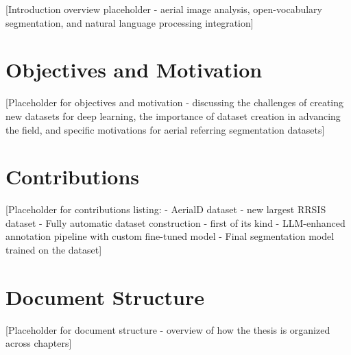 \cleardoublepage
\label{chap:intro}
[Introduction overview placeholder - aerial image analysis, open-vocabulary segmentation, and natural language processing integration]

\section{Objectives and Motivation}

[Placeholder for objectives and motivation - discussing the challenges of creating new datasets for deep learning, the importance of dataset creation in advancing the field, and specific motivations for aerial referring segmentation datasets]

\section{Contributions}

[Placeholder for contributions listing:
- AerialD dataset - new largest RRSIS dataset
- Fully automatic dataset construction - first of its kind
- LLM-enhanced annotation pipeline with custom fine-tuned model
- Final segmentation model trained on the dataset]
\section{Document Structure}

[Placeholder for document structure - overview of how the thesis is organized across chapters]